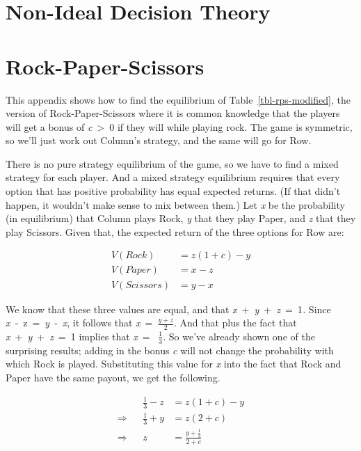\documentclass[
  12pt,
  letterpaper,
  DIV=11,
  numbers=noendperiod]{scrreprt}
\begin{document}
\chapter{Non-Ideal Decision Theory}\label{sec-nidt}

\chapter{Rock-Paper-Scissors}\label{sec-rps}

This appendix shows how to find the equilibrium of
Table~\ref{tbl-rps-modified}, the version of Rock-Paper-Scissors where
it is common knowledge that the players will get a bonus of
\emph{c}~\textgreater~0 if they will while playing rock. The game is
symmetric, so we'll just work out Column's strategy, and the same will
go for Row.

There is no pure strategy equilibrium of the game, so we have to find a
mixed strategy for each player. And a mixed strategy equilibrium
requires that every option that has positive probability has equal
expected returns. (If that didn't happen, it wouldn't make sense to mix
between them.) Let \emph{x} be the probability (in equilibrium) that
Column plays Rock, \emph{y} that they play Paper, and \emph{z} that they
play Scissors. Given that, the expected return of the three options for
Row are:

\begin{align*}
V(Rock) &= z(1+c) - y \\
V(Paper) &= x - z \\
V(Scissors) &= y - x
\end{align*}

We know that these three values are equal, and that
\emph{x}~+~\emph{y}~+~\emph{z}~=~1\emph{.} Since
\emph{x}~‑~z~=~\emph{y}~‑~\emph{x}, it follows that
\emph{x}~=~\(\frac{y+z}{2}\). And that plus the fact that
\emph{x}~+~\emph{y}~+~\emph{z}~=~1 implies that \emph{x}~=~
\(\frac{1}{3}\). So we've already shown one of the surprising results;
adding in the bonus \emph{c} will not change the probability with which
Rock is played. Substituting this value for \emph{x} into the fact that
Rock and Paper have the same payout, we get the following.

\begin{align*}
&& \frac{1}{3} - z &= z(1+c) - y \\
\Rightarrow && \frac{1}{3} + y &= z(2+c) \\
\Rightarrow && z &= \frac{y + \frac{1}{3}}{2 + c}
\end{align*}
\end{document}
